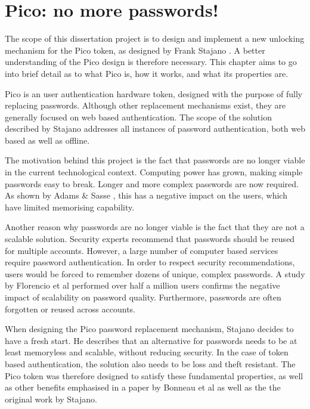 
\chapter{Pico: no more passwords!} %

\label{Chapter2}


The scope of this dissertation project is to design and implement a new unlocking mechanism for the Pico token, as designed by Frank Stajano \cite{stajano2011pico}. A better understanding of the Pico design is therefore necessary. This chapter aims to go into brief detail as to what Pico is, how it works, and what its properties are.

Pico is an user authentication hardware token, designed with the purpose of fully replacing passwords. Although other replacement mechanisms exist, they are generally focused on web based authentication. The scope of the solution described by Stajano addresses all instances of password authentication, both web based as well as offline.

The motivation behind this project is the fact that passwords are no longer viable in the current technological context. Computing power has grown, making simple passwords easy to break. Longer and more complex passwords are now required. As shown by Adams \& Sasse \cite{adams1999users}, this has a negative impact on the users, which have limited memorising capability.

Another reason why passwords are no longer viable is the fact that they are not a scalable solution. Security experts recommend that passwords should be reused for multiple accounts. However, a large number of computer based services require password authentication. In order to respect security recommendations, users would be forced to remember dozens of unique, complex passwords. A study by Florencio et al \cite{florencio2007large} performed over half a million users confirms the negative impact of scalability on password quality. Furthermore, passwords are often forgotten or reused across accounts. 

When designing the Pico password replacement mechanism, Stajano decides to have a fresh start. He describes that an alternative for passwords needs to be at least memoryless and scalable, without reducing security. In the case of token based authentication, the solution also needs to be loss and theft resistant. The Pico token was therefore designed to satisfy these fundamental properties, as well as other benefits emphasised in a paper by Bonneau et al \cite{bonneau2012quest} as well as the the original work by Stajano.

